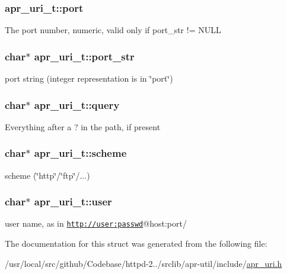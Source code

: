 \subsubsection[{\texorpdfstring{port}{port}}]{ apr\+\_\+uri\+\_\+t\+::port}\hypertarget{structapr__uri__t_a6e6e858ce56b5d58389287c1cc1134fa}{}\label{structapr__uri__t_a6e6e858ce56b5d58389287c1cc1134fa}
The port number, numeric, valid only if port\+\_\+str != N\+U\+LL 
\subsubsection[{\texorpdfstring{port\+\_\+str}{port_str}}]{\setlength{\rightskip}{0pt plus 5cm}char$\ast$ apr\+\_\+uri\+\_\+t\+::port\+\_\+str}\hypertarget{structapr__uri__t_ad9d69051e1fb3f3709260c3c3c014012}{}\label{structapr__uri__t_ad9d69051e1fb3f3709260c3c3c014012}
port string (integer representation is in \char`\"{}port\char`\"{}) 
\subsubsection[{\texorpdfstring{query}{query}}]{\setlength{\rightskip}{0pt plus 5cm}char$\ast$ apr\+\_\+uri\+\_\+t\+::query}\hypertarget{structapr__uri__t_a88d889bcda9e95696022f04ffb470678}{}\label{structapr__uri__t_a88d889bcda9e95696022f04ffb470678}
Everything after a \textquotesingle{}?\textquotesingle{} in the path, if present 
\subsubsection[{\texorpdfstring{scheme}{scheme}}]{\setlength{\rightskip}{0pt plus 5cm}char$\ast$ apr\+\_\+uri\+\_\+t\+::scheme}\hypertarget{structapr__uri__t_a5d62fa370265b6bc956aa86d36024a5d}{}\label{structapr__uri__t_a5d62fa370265b6bc956aa86d36024a5d}
scheme (\char`\"{}http\char`\"{}/\char`\"{}ftp\char`\"{}/...) 
\subsubsection[{\texorpdfstring{user}{user}}]{\setlength{\rightskip}{0pt plus 5cm}char$\ast$ apr\+\_\+uri\+\_\+t\+::user}\hypertarget{structapr__uri__t_a2b763f50bec4fda0cf67e5238275b5fd}{}\label{structapr__uri__t_a2b763f50bec4fda0cf67e5238275b5fd}
user name, as in \href{http://user:passwd}{\tt http\+://user\+:passwd}@host\+:port/ 

The documentation for this struct was generated from the following file\+:\begin{DoxyCompactItemize}
\item 
/usr/local/src/github/\+Codebase/httpd-\/2../srclib/apr-\/util/include/\hyperlink{apr__uri_8h}{apr\+\_\+uri.\+h}\end{DoxyCompactItemize}
